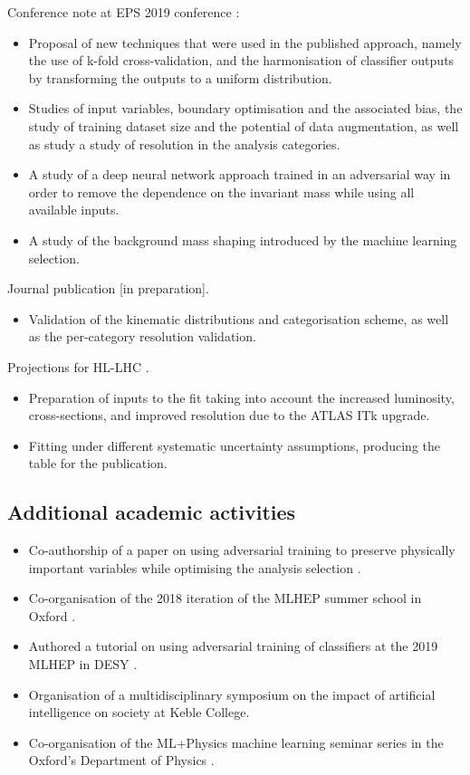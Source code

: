 \begin{originality}
\noindent Conference note at EPS 2019 conference \cite{ATLAS-CONF-2019-028}:
\begin{itemize}
\item Proposal of new techniques that were used in the
published approach, namely the use of k-fold cross-validation,
and the harmonisation of classifier outputs by transforming the
outputs to a uniform distribution.
\item Studies of input variables, boundary optimisation and the
associated bias, the study of training dataset size and the potential
of data augmentation, as well as study a study of resolution in
the analysis categories.
\item A study of a deep neural network approach trained in an
adversarial way in order to remove the dependence on the invariant
mass while using all available inputs.
\item A study of the background mass shaping introduced by the
machine learning selection.
\end{itemize}

\noindent Journal publication [in preparation].
\begin{itemize}
\item Validation of the kinematic distributions and categorisation
scheme, as well as the per-category resolution validation.
\end{itemize}

\noindent Projections for HL-LHC \cite{ATL-PHYS-PUB-2018-054, Cepeda:2019klc}.
\begin{itemize}
\item Preparation of inputs to the fit taking into account the increased
luminosity, cross-sections, and improved resolution due to the ATLAS
ITk upgrade.
\item Fitting under different systematic uncertainty assumptions,
producing the table for the publication.
\end{itemize}

\subsection*{Additional academic activities}

\begin{itemize}
\item Co-authorship of a paper on using adversarial training to preserve
physically important variables while optimising the analysis
selection \cite{Windischhofer:2019ltt}.
\item Co-organisation of the 2018 iteration of the MLHEP summer school
in Oxford \cite{MLHEP2018}.
\item Authored a tutorial on using adversarial training of classifiers
at the 2019 MLHEP in DESY \cite{MLHEP2019}.
\item Organisation of a multidisciplinary symposium on the impact of artificial
intelligence on society at Keble College.
\item Co-organisation of the ML+Physics machine learning seminar
series in the Oxford's Department of Physics \cite{ML+physics}.
\end{itemize}
\end{originality}






